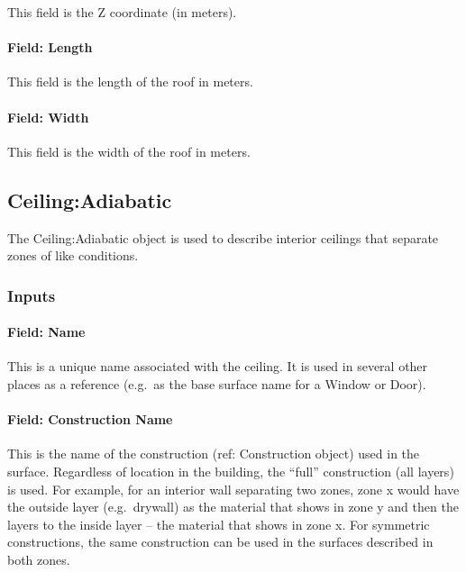 This field is the Z coordinate (in meters).

\paragraph{Field: Length}\label{field-length-4}

This field is the length of the roof in meters.

\paragraph{Field: Width}\label{field-width}

This field is the width of the roof in meters.

\subsection{Ceiling:Adiabatic}\label{ceilingadiabatic}

The Ceiling:Adiabatic object is used to describe interior ceilings that separate zones of like conditions.

\subsubsection{Inputs}\label{inputs-9-024}

\paragraph{Field: Name}\label{field-name-5-026}

This is a unique name associated with the ceiling. It is used in several other places as a reference (e.g.~as the base surface name for a Window or Door).

\paragraph{Field: Construction Name}\label{field-construction-name-5}

This is the name of the construction (ref: Construction object) used in the surface. Regardless of location in the building, the ``full'' construction (all layers) is used. For example, for an interior wall separating two zones, zone x would have the outside layer (e.g.~drywall) as the material that shows in zone y and then the layers to the inside layer -- the material that shows in zone x. For symmetric constructions, the same construction can be used in the surfaces described in both zones.

